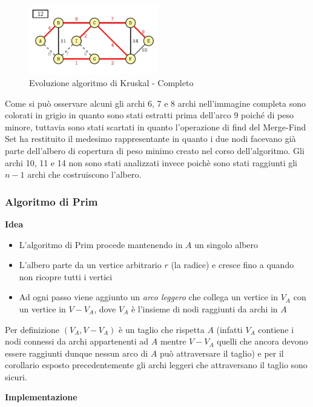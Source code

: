 \documentclass[../cheatSheetAlgoritmi.tex]{subfiles}
\begin{document}
\begin{figure}[h]
	\centering
	\includegraphics[width=0.5\textwidth]{../img/Greedy_8.jpg}
	\caption{Evoluzione algoritmo di Kruskal - Completo}
\end{figure}
Come si può osservare alcuni gli archi 6, 7 e 8 archi nell'immagine completa sono colorati in grigio in quanto sono stati estratti prima dell'arco 9 poiché di peso minore, tuttavia sono stati scartati in quanto l'operazione di find del Merge-Find Set ha restituito il medesimo rappresentante in quanto i due nodi facevano già parte dell'albero di copertura di peso minimo creato nel corso dell'algoritmo. Gli archi 10, 11 e 14 non sono stati analizzati invece poichè sono stati raggiunti gli $n-1$ archi che costruiscono l'albero.
\newpage
\subsubsection{Algoritmo di Prim}
\textbf{Idea}
\begin{itemize}
	\item L'algoritmo di Prim procede mantenendo in $A$ un singolo albero
	\item L'albero parte da un vertice arbitrario $r$ (la radice) e cresce fino a quando non ricopre tutti i vertici
	\item Ad ogni passo viene aggiunto un \emph{arco leggero} che collega un vertice in $V_{A}$ con un vertice in $V - V_{A}$, dove $V_{A}$ è l'insieme di nodi raggiunti da archi in $A$
\end{itemize}
Per definizione $(V_{A}, V - V_{A})$ è un taglio che rispetta $A$ (infatti $V_{A}$ contiene i nodi connessi da archi appartenenti ad $A$ mentre $V-V_{A}$ quelli che ancora devono essere raggiunti dunque nessun arco di $A$ può attraversare il taglio) e per il corollario esposto precedentemente gli archi leggeri che attraversano il taglio sono sicuri.

\bigskip

\textbf{Implementazione}
\end{document}
